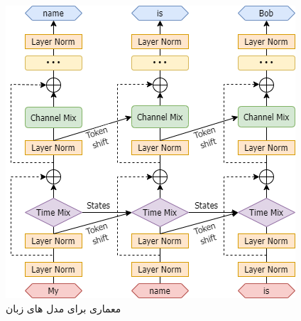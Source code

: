 \begin{figure}[!htb]
  \centering
  \includegraphics[scale=0.5]{Figures/RWKV-arch.png}
  \caption{معماری  برای مدل های زبان
  }
  \label{Fig:RWKV}
\end{figure}

